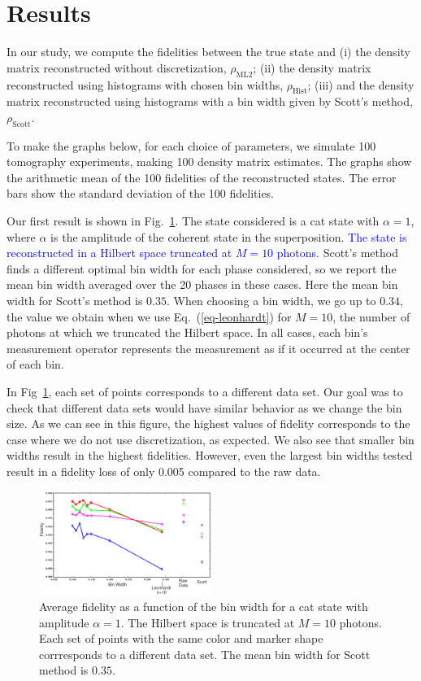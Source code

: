 \documentclass[
reprint,
superscriptaddress,
showpacs,
amsmath,
amssymb,
aps,
pra,
longbibliography
]{revtex4-1}
\providecommand{\editcolor}[2]{\textcolor{#1}{#2}}
\providecommand{\editcolor}[2]{#2}
\newcommand{\HV}[1]{\editcolor{blue}{#1}}
\begin{document}
\section{Results}
\label{results}
In our study, we compute the fidelities between the
true state and (i) the density matrix reconstructed without discretization,
$\rho_{\mathrm{ML2}}$; (ii) the density matrix reconstructed using
histograms with chosen bin widths, $\rho_{\mathrm{Hist}}$; 
(iii) and the density matrix reconstructed using histograms 
with a bin width given by Scott's method, $\rho_{\mathrm{Scott}}$.

To make the graphs below, for each choice of parameters, we simulate 100
tomography experiments, making 100 density matrix estimates.  The
graphs show the arithmetic mean of the 100 fidelities of the
reconstructed states. The error bars show the standard deviation of
the 100 fidelities.

Our first result is shown in
Fig.~\ref{fig-methods_fidelity_singledata}. The state considered is a
cat state with $\alpha = 1$, where $\alpha$ is the amplitude
of the coherent state in the superposition. \HV{The state is reconstructed in a
Hilbert space truncated at $M=10$ photons}. Scott's method
finds a different optimal bin width for each phase
considered, so we report the mean bin width averaged over the 20 phases in
these cases. Here the mean bin width for Scott's method is $0.35$. 
When choosing a bin width, we go up to $0.34$, the value we obtain when 
we use Eq.~(\ref{eq-leonhardt}) for $M=10$, the number of photons 
at which we truncated the Hilbert space. In all cases, each bin's 
measurement operator represents the measurement as if it occurred at
the center of each bin.
 
In Fig~\ref{fig-methods_fidelity_singledata}, each set of points
corresponds to a different data set. Our goal was to check that
different data sets would have similar behavior as we change the bin
size. As we can see in this figure, the highest values of fidelity
corresponds to the case where we do not use discretization, as expected. 
We also see that smaller bin widths result in the highest fidelities. 
However, even the largest bin widths tested result in a fidelity loss 
of only 0.005 compared to the raw data.

\begin{figure}
  \includegraphics[width=0.5\textwidth]{methods_fidelity_singledata.eps}
  \caption{Average fidelity as a function of the bin width for a cat state
    with amplitude $\alpha=1$. The Hilbert space is truncated at $M=10$
    photons. Each set of points with the same color and marker
    shape corrresponds to a different data set. The mean bin width
    for Scott method is $0.35$.}
  \label{fig-methods_fidelity_singledata}
\end{figure}
\end{document}

